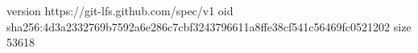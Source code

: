 version https://git-lfs.github.com/spec/v1
oid sha256:4d3a2332769b7592a6e286c7cbf3243796611a8ffe38cf541c56469fc0521202
size 53618
